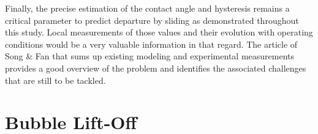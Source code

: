 Finally, the precise estimation of the contact angle and hysteresis remains a critical parameter to predict departure by sliding as demonstrated throughout this study. Local measurements of those values and their evolution with operating conditions would be a very valuable information in that regard. The article of Song \& Fan \cite{song_temperature_2021} that sums up existing modeling and experimental measurements provides a good overview of the problem and identifies the associated challenges that are still to be tackled.




\section{Bubble Lift-Off}


